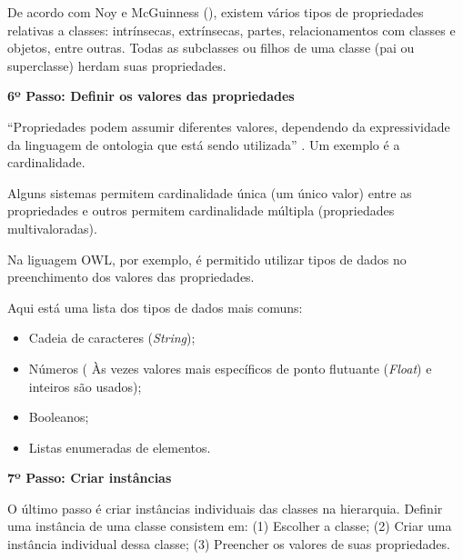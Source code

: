   De acordo com Noy e McGuinness (\citeyear{noy15}), existem vários tipos de propriedades relativas a classes: intrínsecas, 
  extrínsecas, partes, relacionamentos com classes e objetos, entre outras. Todas as subclasses ou filhos de uma classe 
  (pai ou superclasse) herdam suas propriedades.
  
\vspace{0.5cm}  
  
{\raggedright
  \textbf{6º Passo: Definir os valores das propriedades}
}
  
  “Propriedades podem assumir diferentes valores, dependendo da expressividade da linguagem de ontologia que está sendo utilizada”
  \cite{breitman05}. Um exemplo é a cardinalidade.
  
  Alguns sistemas permitem cardinalidade única (um único valor) entre as propriedades e outros permitem cardinalidade múltipla 
  (propriedades multivaloradas). \cite{noy15}
  
  Na liguagem OWL, por exemplo, é permitido utilizar tipos de dados no preenchimento dos valores das propriedades. \cite{breitman05}
  
{\raggedright  
  Aqui está uma lista dos tipos de dados mais comuns:
}
  
  \begin{itemize}
   \item Cadeia de caracteres (\textit{String});
   \item Números ( Às vezes valores mais específicos de ponto flutuante (\textit{Float}) e inteiros são usados);
   \item Booleanos;
   \item Listas enumeradas de elementos.
  \end{itemize}
  
\vspace{0.5cm}  

{\raggedright  
\textbf{7º Passo: Criar instâncias}
}

  O último passo é criar instâncias individuais das classes na hierarquia. Definir uma instância de uma classe consistem em:
  (1) Escolher a classe; 
  (2) Criar uma instância individual dessa classe; 
  (3) Preencher os valores de suas propriedades. \cite{noy15}
  